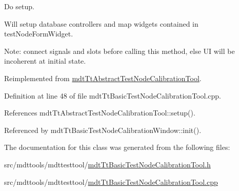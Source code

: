 Do setup. 

Will setup database controllers and map widgets contained in test\-Node\-Form\-Widget.

Note\-: connect signals and slots before calling this method, else U\-I will be incoherent at initial state. 

Reimplemented from \hyperlink{classmdt_tt_abstract_test_node_calibration_tool_a89e27cd930547aef0ba143519408ce1b}{mdt\-Tt\-Abstract\-Test\-Node\-Calibration\-Tool}.



Definition at line 48 of file mdt\-Tt\-Basic\-Test\-Node\-Calibration\-Tool.\-cpp.



References mdt\-Tt\-Abstract\-Test\-Node\-Calibration\-Tool\-::setup().



Referenced by mdt\-Tt\-Basic\-Test\-Node\-Calibration\-Window\-::init().



The documentation for this class was generated from the following files\-:\begin{DoxyCompactItemize}
\item 
src/mdttools/mdttesttool/\hyperlink{mdt_tt_basic_test_node_calibration_tool_8h}{mdt\-Tt\-Basic\-Test\-Node\-Calibration\-Tool.\-h}\item 
src/mdttools/mdttesttool/\hyperlink{mdt_tt_basic_test_node_calibration_tool_8cpp}{mdt\-Tt\-Basic\-Test\-Node\-Calibration\-Tool.\-cpp}\end{DoxyCompactItemize}
